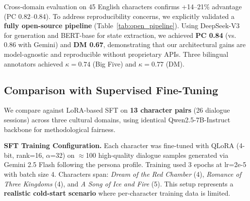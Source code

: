 \documentclass[11pt]{article}
\begin{document}
\begin{CJK*}{UTF8}{gbsn}
Cross-domain evaluation on 45 English characters confirms +14--21\% advantage (PC 0.82--0.84). To address reproducibility concerns, we explicitly validated a \textbf{fully open-source pipeline} (Table~\ref{tab:open_pipeline}). Using DeepSeek-V3 for generation and BERT-base for state extraction, we achieved \textbf{PC 0.84} (vs. 0.86 with Gemini) and \textbf{DM 0.67}, demonstrating that our architectural gains are model-agnostic and reproducible without proprietary APIs. Three bilingual annotators achieved $\kappa = 0.74$ (Big Five) and $\kappa = 0.77$ (DM).

\subsection{Comparison with Supervised Fine-Tuning}
\label{sec:sft_comparison}

We compare against LoRA-based SFT on \textbf{13 character pairs} (26 dialogue sessions) across three cultural domains, using identical Qwen2.5-7B-Instruct backbone for methodological fairness.

\textbf{SFT Training Configuration.} Each character was fine-tuned with QLoRA (4-bit, rank=16, $\alpha$=32) on $\approx$100 high-quality dialogue samples generated via Gemini 2.5 Flash following the persona profile. Training used 3 epochs at lr=2e-5 with batch size 4. Characters span: \textit{Dream of the Red Chamber} (4), \textit{Romance of Three Kingdoms} (4), and \textit{A Song of Ice and Fire} (5). This setup represents a \textbf{realistic cold-start scenario} where per-character training data is limited.

\begin{table}[t]
\centering
\small
{}
\caption{Four-group comparison on 30-turn dialogues (N=26 sessions). Rep.=response repetition rate (first-50-char overlap). SFT shows \textit{highest} repetition (57.7\%) and drift (66.0\%), revealing a fundamental failure mode.}
\label{tab:sft_comparison}
\end{table}


\end{CJK*}
\end{document}
